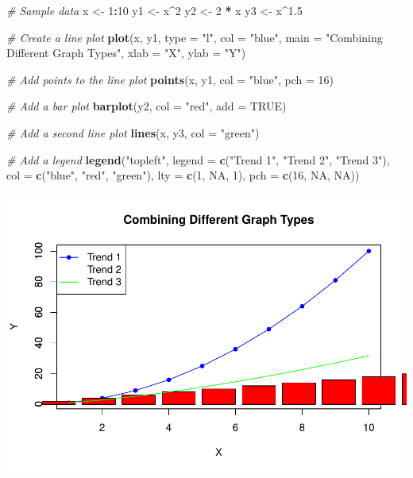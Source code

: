 \documentclass[
]{book}
\newenvironment{Shaded}{\begin{snugshade}}{\end{snugshade}}
\newcommand{\AttributeTok}[1]{\textcolor[rgb]{0.13,0.29,0.53}{#1}}
\newcommand{\CommentTok}[1]{\textcolor[rgb]{0.56,0.35,0.01}{\textit{#1}}}
\newcommand{\ConstantTok}[1]{\textcolor[rgb]{0.56,0.35,0.01}{#1}}
\newcommand{\DecValTok}[1]{\textcolor[rgb]{0.00,0.00,0.81}{#1}}
\newcommand{\FloatTok}[1]{\textcolor[rgb]{0.00,0.00,0.81}{#1}}
\newcommand{\FunctionTok}[1]{\textcolor[rgb]{0.13,0.29,0.53}{\textbf{#1}}}
\newcommand{\NormalTok}[1]{#1}
\newcommand{\OtherTok}[1]{\textcolor[rgb]{0.56,0.35,0.01}{#1}}
\newcommand{\SpecialCharTok}[1]{\textcolor[rgb]{0.81,0.36,0.00}{\textbf{#1}}}
\newcommand{\StringTok}[1]{\textcolor[rgb]{0.31,0.60,0.02}{#1}}
\begin{document}
\begin{Shaded}
\begin{Highlighting}[]
\CommentTok{\# Sample data}
\NormalTok{x }\OtherTok{\textless{}{-}} \DecValTok{1}\SpecialCharTok{:}\DecValTok{10}
\NormalTok{y1 }\OtherTok{\textless{}{-}}\NormalTok{ x}\SpecialCharTok{\^{}}\DecValTok{2}
\NormalTok{y2 }\OtherTok{\textless{}{-}} \DecValTok{2} \SpecialCharTok{*}\NormalTok{ x}
\NormalTok{y3 }\OtherTok{\textless{}{-}}\NormalTok{ x}\SpecialCharTok{\^{}}\FloatTok{1.5}

\CommentTok{\# Create a line plot}
\FunctionTok{plot}\NormalTok{(x, y1, }\AttributeTok{type =} \StringTok{"l"}\NormalTok{, }\AttributeTok{col =} \StringTok{"blue"}\NormalTok{, }\AttributeTok{main =} \StringTok{"Combining Different Graph Types"}\NormalTok{, }\AttributeTok{xlab =} \StringTok{"X"}\NormalTok{, }\AttributeTok{ylab =} \StringTok{"Y"}\NormalTok{)}

\CommentTok{\# Add points to the line plot}
\FunctionTok{points}\NormalTok{(x, y1, }\AttributeTok{col =} \StringTok{"blue"}\NormalTok{, }\AttributeTok{pch =} \DecValTok{16}\NormalTok{)}

\CommentTok{\# Add a bar plot}
\FunctionTok{barplot}\NormalTok{(y2, }\AttributeTok{col =} \StringTok{"red"}\NormalTok{, }\AttributeTok{add =} \ConstantTok{TRUE}\NormalTok{)}

\CommentTok{\# Add a second line plot}
\FunctionTok{lines}\NormalTok{(x, y3, }\AttributeTok{col =} \StringTok{"green"}\NormalTok{)}

\CommentTok{\# Add a legend}
\FunctionTok{legend}\NormalTok{(}\StringTok{"topleft"}\NormalTok{, }\AttributeTok{legend =} \FunctionTok{c}\NormalTok{(}\StringTok{"Trend 1"}\NormalTok{, }\StringTok{"Trend 2"}\NormalTok{, }\StringTok{"Trend 3"}\NormalTok{), }\AttributeTok{col =} \FunctionTok{c}\NormalTok{(}\StringTok{"blue"}\NormalTok{, }\StringTok{"red"}\NormalTok{, }\StringTok{"green"}\NormalTok{), }\AttributeTok{lty =} \FunctionTok{c}\NormalTok{(}\DecValTok{1}\NormalTok{, }\ConstantTok{NA}\NormalTok{, }\DecValTok{1}\NormalTok{), }\AttributeTok{pch =} \FunctionTok{c}\NormalTok{(}\DecValTok{16}\NormalTok{, }\ConstantTok{NA}\NormalTok{, }\ConstantTok{NA}\NormalTok{))}
\end{Highlighting}
\end{Shaded}

\includegraphics{_main_files/figure-latex/unnamed-chunk-53-1.pdf}
\end{document}
